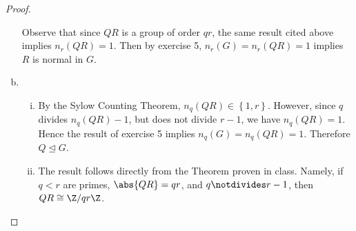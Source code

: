 \documentclass[10pt]{amsart}
\begin{document}
\begin{thm}
\begin{proof}
\begin{enumerate}[(a)]
      Observe that since $QR$ is a group of order $qr$, the same result cited above implies $n_r(QR) = 1$.
      Then by exercise 5, $n_r(G) = n_r(QR) = 1$ implies $R$ is normal in $G$.
    \item
      \begin{enumerate}[(i)]
        \item
          By the Sylow Counting Theorem, $n_q(QR) \in \left\{1,r\right\}$.
          However, since $q$ divides $n_q(QR) - 1$, but does not divide $r-1$, we have $n_q(QR) = 1$.
          Hence the result of exercise 5 implies $n_q(G) = n_q(QR) = 1$.
          Therefore $Q \unlhd G$.
        \item
          The result follows directly from the Theorem proven in class.  Namely, if $q < r$ are primes, $\abs{QR} = qr$, and $q \notdivides r-1$, then $QR \cong \Z/qr\Z$.
      \end{enumerate}
    \end{enumerate}
  \end{proof}
\end{thm}
\end{document}
